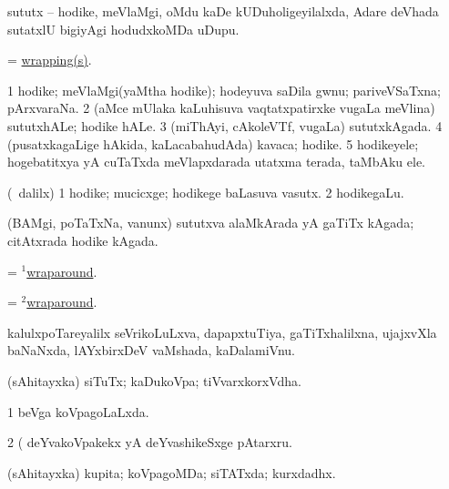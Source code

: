 \bentry
{} 
\gl{\nA}
\expl{}
\bmng
sututx -- hodike, meVlaMgi, oMdu kaDe kUDuholigeyilalxda, Adare deVhada sutatxlU bigiyAgi hodudxkoMDa uDupu. 
\emng
\eentry

\bentry
{} 
\gl{\nA}
\expl{}
\bmng
= \hyperlink{wrapping}{wrapping(s)}. 
\emng
\eentry

\bentry
{} 
\gl{\nA}
\expl{}
\bmng
\bnum
\num{1} hodike; meVlaMgi(yaMtha hodike); hodeyuva saDila gwnu; pariveVSaTxna; pArxvaraNa. 
\num{2} (aMce mUlaka kaLuhisuva vaqtatxpatirxke \mo vugaLa meVlina) sututxhALe; hodike hALe. 
\num{3} (miThAyi, cAkoleVTf, \mo vugaLa) sututxkAgada. 
\num{4} (pusatxkagaLige hAkida, kaLacabahudAda) kavaca; hodike. 
\num{5} hodikeyele; hogebatitxya yA cuTaTxda meVlapxdarada utatxma terada, taMbAku ele. 
\enum
\emng
\eentry

\bentry
{} 
\gl{\nA}
\expl{}
\bmng
(\kanmu\ \bava dalilx) 
\bnum
\num{1} hodike; mucicxge; hodikege baLasuva vasutx. 
\num{2} hodikegaLu. 
\enum
\emng
\eentry

\bentry
{} 
\gl{\nA}
\expl{}
\bmng
(BAMgi, poTaTxNa, \mo vanunx) sututxva alaMkArada yA gaTiTx kAgada; citAtxrada hodike kAgada. 
\emng
\eentry

\bentry 
{} 
\gl{\nA}
\expl{}
\bmng
= \hyperlink{wraparound(1)}{$^1$wraparound}. 
\emng
\eentry

\bentry 
{} 
\gl{\gu}
\expl{}
\bmng
= \hyperlink{wraparound(2)}{$^2$wraparound}. 
\emng
\eentry

\bentry
{} 
\gl{\nA}
\expl{}
\bmng
kalulxpoTareyalilx seVrikoLuLxva, dapapxtuTiya, gaTiTxhalilxna, ujajxvXla baNaNxda, lAYxbirxDeV vaMshada, kaDalamiVnu. 
\emng
\eentry

\bentry
{} 
\gl{\nA}
\expl{}
\bmng
(sAhitayxka) siTuTx; kaDukoVpa; tiVvarxkorxVdha. 
\emng

\noindent
\gl{\pagu}
\expl{}
\bmng
\bnum
\num{1}  beVga koVpagoLaLxda. 
\num{2}  (  deYvakoVpakekx yA deYvashikeSxge pAtarxru. 
\enum
\emng
\eentry

\bentry
{} 
\gl{\gu}
\expl{}
\bmng
(sAhitayxka) kupita; koVpagoMDa; siTATxda; kurxdadhx. 
\emng
\eentry

